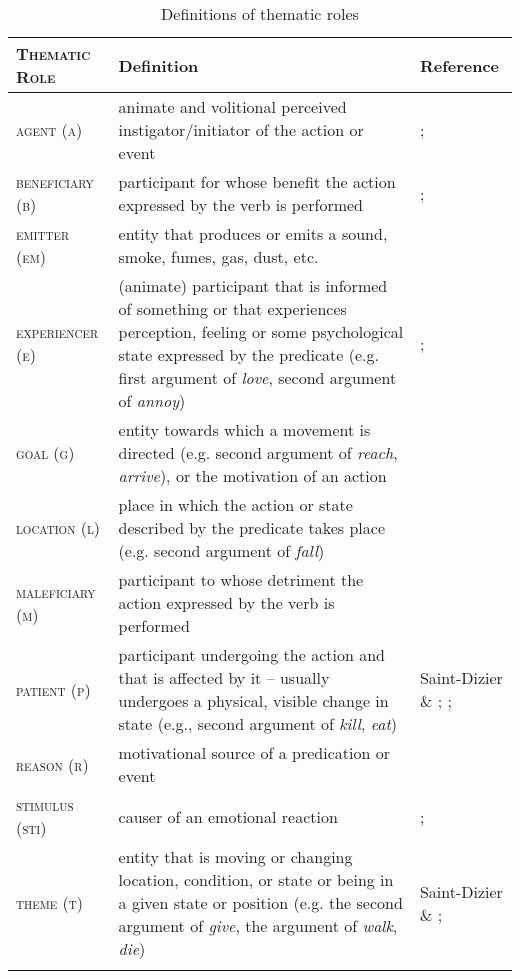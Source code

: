 \documentclass[output=paper]{langsci/langscibook}
\begin{document}
\begin{table}
\caption{Definitions of thematic roles}
\label{tab:sibanda:1}
\small
\begin{tabularx}{\textwidth}{>{\scshape}lXp{2cm}}
\lsptoprule
 \textup{Thematic Role} & {Definition} & {Reference}\\
\midrule
 {{agent (a)}} & {animate and volitional perceived instigator/initiator of the action or event} & {\citet{Fillmore1968}; \citet[49]{Payne1997}}\\
\tablevspace
 {{beneficiary (b)}} & {participant for whose benefit the action expressed by the verb is performed} & {\citet[11]{SaintDizierViegas1995}; \citet[4]{PalmerEtAl2010}}\\
\tablevspace
 {{emitter (em)}} & {entity that produces or emits a sound, smoke, fumes, gas, dust, etc.} & \\
\tablevspace
 {{experiencer (e)}} & {(animate) participant that is informed of something or that experiences perception, feeling or some psychological state expressed by the predicate (e.g. first argument of \textit{love}, second argument of \textit{annoy})} & {\citet[11]{SaintDizierViegas1995}; \citet[113]{Lobner2002}}\\
\tablevspace
 {{goal (g)}} & {entity towards which a movement is directed (e.g. second argument of \textit{reach}, \textit{arrive}), or the motivation of an action} & {\citet[11]{SaintDizierViegas1995}}\\
\tablevspace
 {{location (l)}} & {place in which the action or state described by the predicate takes place (e.g. second argument of \textit{fall})} & {\citet[11]{SaintDizierViegas1995}}\\
\tablevspace
 {{maleficiary (m)}} & {participant to whose detriment the action expressed by the verb is performed}  & \citep[5]{KittiläZúñiga2010}\\
\tablevspace
 {{patient (p)}} & {participant undergoing the action and that is affected by it – usually undergoes a physical, visible change in state (e.g., second argument of \textit{kill}, \textit{eat})}  & {Saint-Dizier \& \citet[11]{Viegas1995}; \citet[4]{PalmerEtAl2010}; \citet[51]{Payne1997}}\\
\tablevspace
 {{reason (r)}} & {motivational source of a predication or event} & {\citet[225]{Frawley1992}}\\
\tablevspace
 {{stimulus (sti)}} & {causer of an emotional reaction} & {\citet[13]{PalmerEtAl2010}; \citet{Dowty1991}}\\
\tablevspace
 {{theme (t)}} & {entity that is moving or changing location, condition, or state or being in a given state or position (e.g. the second argument of \textit{give}, the argument of \textit{walk}, \textit{die})} & {Saint-Dizier \& \citet[11]{Viegas1995}; \citet[4]{PalmerEtAl2010}}\\
\lspbottomrule
\end{tabularx}
\end{table}
\end{document}
